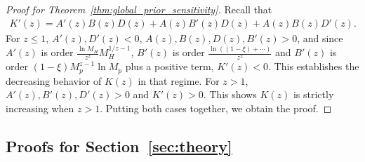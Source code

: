\documentclass[12pt]{article}
\begin{document}
\begin{proof}[Proof for Theorem~\ref{thm:global_prior_sensitivity}]
    Recall that
    \begin{align*}
        K'(z) = A'(z) B(z) D(z) + A(z) B'(z) D(z) + A(z) B(z) D'(z).
    \end{align*}
    For $z \leq 1$, $A'(z), D'(z) < 0$, $A(z), B(z), D(z), B'(z) > 0$, and since $A'(z)$ is order $\frac{\ln M_H}{z^2} M_H^{1/z - 1}$, $B'(z)$ is order $\frac{\ln((1 - \xi) + \cdots)}{z^2}$ and $B'(z)$ is order $(1 - \xi)M_p^{z - 1} \ln M_p$ plus a positive term, $K'(z) < 0$.
    This establishes the decreasing behavior of $K(z)$ in that regime.
    For $z > 1$, $A'(z), B'(z), D'(z) > 0$ and $K'(z) > 0$.
    This shows $K(z)$ is strictly increasing when $z > 1$.
    Putting both cases together, we obtain the proof.
\end{proof}

\subsection{Proofs for Section~\ref{sec:theory}}
\end{document}
